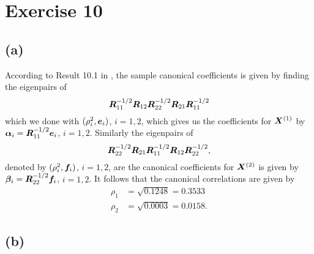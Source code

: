 
\section*{Exercise 10}
\label{sec:exercise-10}

\subsection*{(a)}
\label{sec:a-6}

According to Result 10.1 in \cite[p. 541]{book}, the sample canonical coefficients is given by finding the eigenpairs of
\begin{equation*}
  \bm{R}_{11}^{-1/2} \bm{R}_{12} \bm{R}_{22}^{-1/2} \bm{R}_{21} \bm{R}_{11}^{-1/2}
\end{equation*}
which we done with $(\rho^{2}_{i}, \bm{e}_{i})$, $i =1,2$, which gives us the
coefficients for $\bm{X}^{(1)}$ by $\bm{\alpha}_{i} = \bm{R}_{11}^{-1/2} \bm{e}_{i}$, $i =1,2$. Similarly the eigenpairs of
\begin{equation*}
  \bm{R}_{22}^{-1/2} \bm{R}_{21} \bm{R}_{11}^{-1/2} \bm{R}_{12} \bm{R}_{22}^{-1/2},
\end{equation*}
denoted by $(\rho^{2}_{i}, \bm{f}_{i})$, $i =1,2$, are the canonical coefficients for $\bm{X}^{(2)}$ is given by $\bm{\beta}_{i} = \bm{R}_{22}^{-1/2} \bm{f}_{i}$, $i= 1,2$. It
follows that the canonical correlations are given by
\begin{align*}
  \rho_{1} &=  \sqrt{0.1248} =  0.3533\\
  \rho_{2} &=  \sqrt{0.0003} = 0.0158.
\end{align*}

\subsection*{(b)}
\label{sec:b-9}

